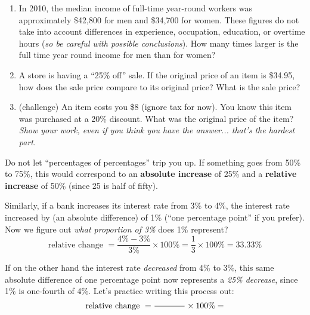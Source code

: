 \documentclass[12pt]{article}
\begin{document}
\pagebreak
\begin{enumerate}
\item In 2010, the median income of full-time year-round workers was approximately \$42,800 for men and \$34,700 for women.  These figures do not take into account differences in experience, occupation, education, or overtime hours (\emph{so be careful with possible conclusions}). How many times larger is the full time year round income for men than for women?
\vspace{1in}

\item A store is having a “25\% off” sale.  If the original price of an item is \$34.95, how does the sale price compare to its original price? What is the sale price?
\vspace{1in}

\item (challenge) An item costs you \$8 (ignore tax for now). You know this item was purchased at a 20\% discount. What was the original price of the item? \textit{Show your work, even if you think you have the answer... that's the hardest part.}
\vspace{1in}

\end{enumerate}
Do not let ``percentages of percentages'' trip you up. If something goes from 50\% to 75\%, this would correspond to an \textbf{absolute increase} of 25\% and a \textbf{relative increase} of 50\% (since 25 is half of fifty). 

Similarly, if a bank increases its interest rate from 3\% to 4\%, the interest rate increased by (an absolute difference) of 1\% (``one percentage point'' if you prefer).
Now we figure out \emph{what proportion of 3\%} does 1\% represent?
\[
\text{relative change } = \frac{4\% - 3\%}{3\%}\times 100\% = \frac{1}{3}\times 100\% = 33.33\%
\]

If on the other hand the interest rate \emph{decreased} from 4\% to 3\%, this same absolute difference of one percentage point now represents a \emph{25\% decrease}, since 1\% is one-fourth of 4\%. Let's practice writing this process out:
\[
\text{relative change } = \frac{\hspace{0.5in}}{\hspace{0.5in}}\times 100\% = 
\]
\end{document}

